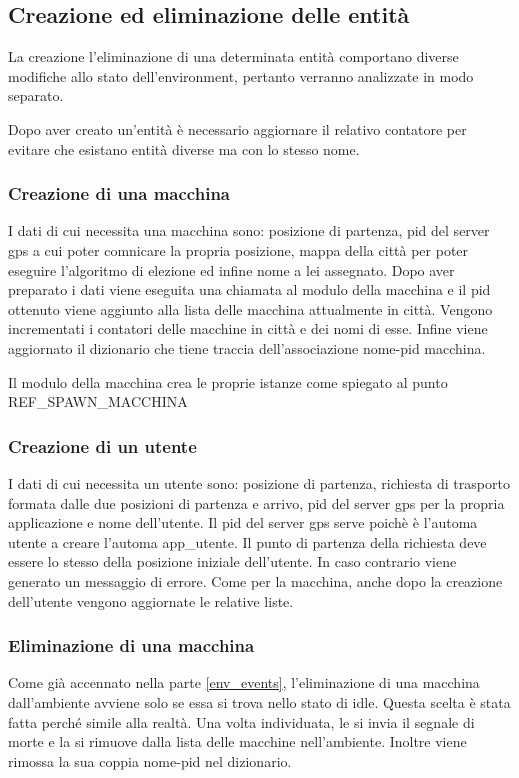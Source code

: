 \subsection{Creazione ed eliminazione delle entità} \label{creazione_distruzione_entita}
La creazione l'eliminazione di una determinata entità comportano diverse modifiche allo stato dell'environment, pertanto verranno analizzate in modo separato.

Dopo aver creato un'entità è necessario aggiornare il relativo contatore per evitare che esistano entità diverse ma con lo stesso nome.

\subsubsection{Creazione di una macchina}
I dati di cui necessita una macchina sono: posizione di partenza, pid del server gps a cui poter comnicare la propria posizione, mappa della città per poter eseguire l'algoritmo di elezione ed infine nome a lei assegnato. Dopo aver preparato i dati viene eseguita una chiamata al modulo della macchina e il pid ottenuto viene aggiunto alla lista delle macchina attualmente in città. Vengono incrementati i contatori delle macchine in città e dei nomi di esse. Infine viene aggiornato il dizionario che tiene traccia dell'associazione nome-pid macchina.

Il modulo della macchina crea le proprie istanze come spiegato al punto REF\_SPAWN\_MACCHINA

\subsubsection{Creazione di un utente}
I dati di cui necessita un utente sono: posizione di partenza, richiesta di trasporto formata dalle due posizioni di partenza e arrivo, pid del server gps per la propria applicazione e nome dell'utente. Il pid del server gps serve poichè è l'automa utente a creare l'automa app\_utente. Il punto di partenza della richiesta deve essere lo stesso della posizione iniziale dell'utente. In caso contrario viene generato un messaggio di errore. Come per la macchina, anche dopo la creazione dell'utente vengono aggiornate le relative liste.

\subsubsection{Eliminazione di una macchina}
Come già accennato nella parte \ref{env_events}, l'eliminazione di una macchina dall'ambiente avviene solo se essa si trova nello stato di idle. Questa scelta è stata fatta perché simile alla realtà. Una volta individuata, le si invia il segnale di morte e la si rimuove dalla lista delle macchine nell'ambiente. Inoltre viene rimossa la sua coppia nome-pid nel dizionario.

